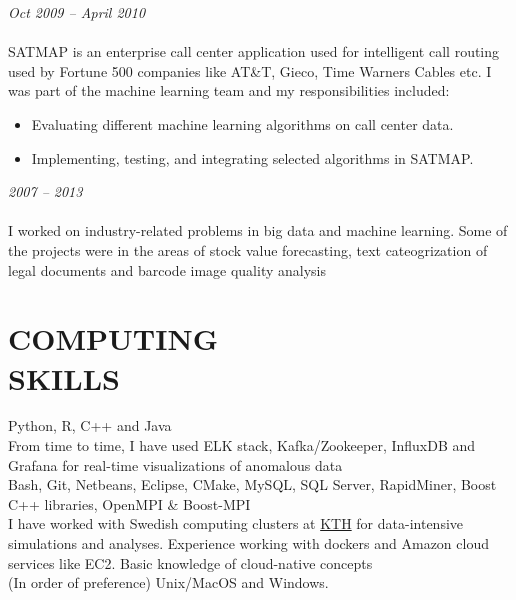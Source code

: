 \documentclass[margin, 10pt]{res} %
\begin{document}
\begin{resume}
{\sl {}} \hfill \textit{Oct 2009 -- April 2010} \\
{\href{http://www.satmapinc.com/}{\color{RubineRed}{Afiniti (formerly TRG SATMAP), Machine Learning Team, Pakistan}}}  \\
SATMAP is an enterprise call center application used for intelligent call routing used by Fortune 500 companies like AT\&T, Gieco, Time Warners Cables etc. I was part of the machine learning team and my responsibilities included:

\begin{itemize} \itemsep -2pt %
\item Evaluating different machine learning algorithms on call center data. 
\item Implementing, testing, and integrating selected algorithms in SATMAP. 
\end{itemize}
 

{\sl \textbf{}} \hfill \textit{2007 -- 2013} \\
{\href{https://www.upwork.com/freelancers/~013a228837c241737c?viewMode=1}{\color{RubineRed}{Upwork profile}}}  \\
I worked on industry-related problems in big data and machine learning. Some of the projects were in the areas of 
stock value forecasting, text cateogrization of legal documents and barcode image quality analysis



\section{COMPUTING \\ SKILLS} 

{\bf \color{Brown}{Languages:}} 
Python, R, C++ and Java\\
{\bf \color{Brown}{Data/Streaming pipelines:}} From time to time, I have used ELK stack, Kafka/Zookeeper, InfluxDB and Grafana for real-time visualizations of anomalous data \\
{\bf \color{Brown}{Misc Tools:}} Bash, Git, Netbeans, Eclipse, CMake, MySQL, SQL Server, RapidMiner, Boost C++ libraries, OpenMPI \& Boost-MPI \\
{\bf \color{Brown}{Cluster/Cloud infrastructure:}} I have worked with Swedish computing clusters at \href{https://www.pdc.kth.se/hpc-services/computing-systems}{KTH} for data-intensive simulations and analyses. 
Experience working with dockers and Amazon cloud services like EC2. Basic knowledge of cloud-native concepts \\
{\bf \color{Brown}{Operating Systems:}} (In order of preference) Unix/MacOS and Windows.


\end{resume}
\end{document}
